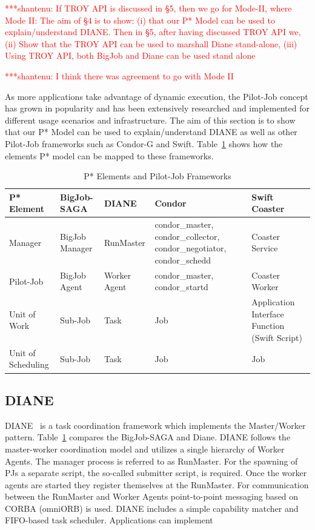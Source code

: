 \documentclass[conference,final]{IEEEtran}
\newcommand{\jhanote}[1]{ {\textcolor{red} { ***shantenu: #1 }}}
\newcommand{\jhanote}[1]{}
\begin{document}
\jhanote{If TROY API is discussed in \S 5, then we go for Mode-II,
  where Mode II: The aim of \S 4 is to show: (i) that our P* Model can
  be used to explain/understand DIANE.  Then in \S 5, after having
  discussed TROY API we, (ii) Show that the TROY API can be used to
  marshall Diane stand-alone, (iii) Using TROY API, both BigJob and
  Diane can be used stand alone}

\jhanote{I think there was agreement to go with Mode II}

As more applications take advantage of dynamic execution, the Pilot-Job concept
has grown in popularity and has been extensively researched and implemented for
different usage scenarios and infrastructure. The aim of this section is to show
that our P* Model can be used to explain/understand DIANE as well as other
Pilot-Job frameworks such as Condor-G and Swift.
Table~\ref{table:bigjob-saga-diane} shows how the elements P* model can be
mapped to these frameworks.

\begin{table}[t]
\centering
\begin{tabular}{|p{2.5cm}|p{3cm}|p{3cm}|p{3cm}|p{3cm}|}
\hline
\textbf{P* Element} &\textbf{BigJob-SAGA} &\textbf{DIANE} &\textbf{Condor} 
&\textbf{Swift Coaster}  \\
\hline
Manager &BigJob Manager & RunMaster & condor\_master, condor\_collector, condor\_negotiator, condor\_schedd &Coaster Service\\ 
\hline
Pilot-Job &BigJob Agent  & Worker Agent &condor\_master, condor\_startd &Coaster Worker\\
\hline
Unit of Work &Sub-Job &Task &Job &Application Interface Function (Swift Script)\\
\hline
Unit of Scheduling &Sub-Job &Task &Job &Job\\
\hline
\end{tabular}
\caption{P* Elements and Pilot-Job Frameworks} \label{table:bigjob-saga-diane}
\end{table}

\subsection{DIANE}

DIANE~\cite{Moscicki:908910} is a task coordination framework which implements
the Master/Worker pattern. Table~\ref{table:bigjob-saga-diane} compares the
BigJob-SAGA and Diane. DIANE follows the master-worker coordination model and
utilizes a single hierarchy of Worker Agents. The manager process is referred to
as RunMaster. For the spawning of PJs a separate script, the so-called submitter
script, is required. Once the worker agents are started they register themselves
at the RunMaster. For communication between the RunMaster and Worker Agents
point-to-point messaging based on CORBA (omniORB) is used. DIANE includes a simple capability matcher and FIFO-based task scheduler. Applications can implement
\end{document}
